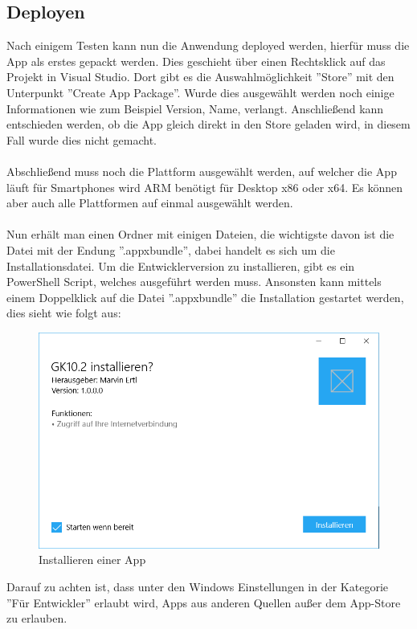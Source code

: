 \subsection{Deployen}

Nach einigem Testen kann nun die Anwendung deployed werden, hierfür muss die App als erstes gepackt werden. Dies geschieht über einen Rechtsklick auf das Projekt in Visual Studio. Dort gibt es die Auswahlmöglichkeit ''Store'' mit den Unterpunkt ''Create App Package''. Wurde dies ausgewählt werden noch einige Informationen wie zum Beispiel Version, Name, verlangt. Anschließend kann entschieden werden, ob die App gleich direkt in den Store geladen wird, in diesem Fall wurde dies nicht gemacht.
\\\\
Abschließend muss noch die Plattform ausgewählt werden, auf welcher die App läuft für Smartphones wird ARM benötigt für Desktop x86 oder x64. Es können aber auch alle Plattformen auf einmal ausgewählt werden.
\\\\
Nun erhält man einen Ordner mit einigen Dateien, die wichtigste davon ist die Datei mit der Endung ''.appxbundle'', dabei handelt es sich um die Installationsdatei. \cite{packaging} Um die Entwicklerversion zu installieren, gibt es ein PowerShell Script, welches ausgeführt werden muss. Ansonsten kann mittels einem Doppelklick auf die Datei ''.appxbundle'' die Installation gestartet werden, dies sieht wie folgt aus: 

\begin{figure}[H]
	\centering
	\includegraphics[width=0.7\linewidth]{images/screenshot007}
	\caption{Installieren einer App}
	\label{fig:screenshot007}
\end{figure}

Darauf zu achten ist, dass unter den Windows Einstellungen in der Kategorie ''Für Entwickler'' erlaubt wird, Apps aus anderen Quellen außer dem App-Store zu erlauben.

